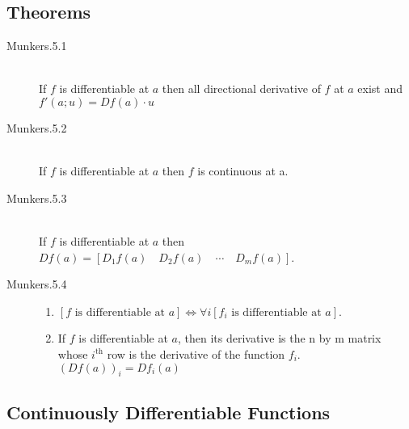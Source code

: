 \subsection{Theorems}
\begin{description}
	\item[Munkers.5.1] \hfill \\
		If $f$ is differentiable at $a$ then all directional
		derivative of $f$ at $a$ exist and
		$f'(a;u)=Df(a)\cdot u$
		
	\item[Munkers.5.2] \hfill \\
		If $f$ is differentiable at $a$ then $f$ is continuous at a.
		
	\item[Munkers.5.3] \hfill \\
		If $f$ is differentiable at $a$
		then $Df(a)=[D_1f(a) \quad D_2f(a) \quad \cdots \quad D_mf(a)]$.
		
	\item[Munkers.5.4] \hfill
	\begin{enumerate}
		\renewcommand{\labelenumi}{\alph{enumi}.}
		\item
		$[f \textrm{ is differentiable at } a ]
			\Leftrightarrow
			\forall i [f_i \textrm{ is differentiable at } a]$.
			
		\item
		If $f$ is differentiable at $a$, then its derivative is the n by m
		matrix whose $i^\textrm{th}$ row is the derivative of the function $f_i$. $(Df(a))_{i} = Df_i(a)$
	\end{enumerate}
\end{description}

\subsection{Continuously Differentiable Functions}


